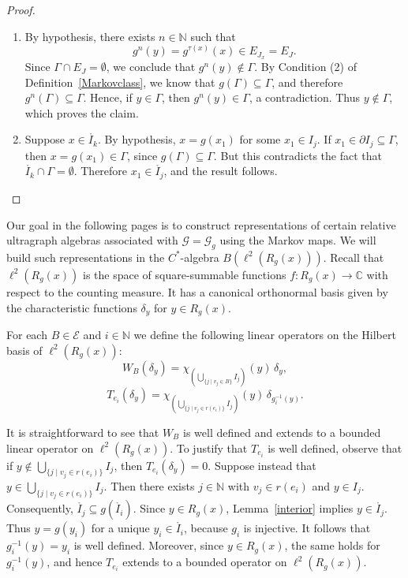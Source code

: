 \documentclass[12pt, reqno]{amsart}
\theoremstyle{definition}
\theoremstyle{remark}
\numberwithin{equation}{section}
\begin{document}
\begin{proof}
\begin{enumerate}
    \item By hypothesis, there exists $n \in \mathbb{N}$ such that 
    \[
    g^n(y) = g^{\tau(x)}(x) \in E_{J_x} = E_J.
    \]
    Since $\Gamma \cap E_J = \emptyset$, we conclude that 
    $g^n(y) \notin \Gamma$. 
    By Condition (2) of Definition~\ref{Markovclass}, we know that 
    $g(\Gamma) \subseteq \Gamma$, and therefore $g^n(\Gamma) \subseteq \Gamma$. 
    Hence, if $y \in \Gamma$, then $g^n(y) \in \Gamma$, a contradiction. 
    Thus $y \notin \Gamma$, which proves the claim.

    \item Suppose $x \in \mathring{I_k}$. 
    By hypothesis, $x = g(x_1)$ for some $x_1 \in I_j$. 
    If $x_1 \in \partial I_j \subseteq \Gamma$, then $x = g(x_1) \in \Gamma$, 
    since $g(\Gamma) \subseteq \Gamma$. 
    But this contradicts the fact that 
    $\mathring{I_k} \cap \Gamma = \emptyset$. 
    Therefore $x_1 \in \mathring{I_j}$, and the result follows.
\end{enumerate}
\end{proof}


Our goal in the following pages is to construct representations of certain 
relative ultragraph algebras associated with $\mathcal{G} = \mathcal{G}_g$ 
using the Markov maps. 
We will build such representations in the $C^*$-algebra $B(\ell^2(R_g(x)))$. 
Recall that $\ell^2(R_g(x))$ is the space of square-summable functions 
$f:R_g(x) \to \mathbb{C}$ with respect to the counting measure. 
It has a canonical orthonormal basis given by the characteristic functions 
$\delta_y$ for $y \in R_g(x)$. 

For each $B \in \mathcal{E}$ and $i \in \mathbb{N}$ we define the following 
linear operators on the Hilbert basis of $\ell^2(R_g(x))$:
\[
W_B(\delta_y) 
   = \chi_{\left( \bigcup\limits_{\{j \mid v_j \in B \}} I_j \right)}(y)\,\delta_y,
\]
\[
T_{e_i}(\delta_y) 
   = \chi_{\left( \bigcup\limits_{\{j \mid v_j \in r(e_i) \}} I_j \right)}(y)\,
      \delta_{g_i^{-1}(y)}.
\]

It is straightforward to see that $W_B$ is well defined and extends to a 
bounded linear operator on $\ell^2(R_g(x))$. 
To justify that $T_{e_i}$ is well defined, observe that if 
$y \notin \bigcup_{\{j \mid v_j \in r(e_i)\}} I_j$, 
then $T_{e_i}(\delta_y) = 0$. 
Suppose instead that 
$y \in \bigcup_{\{j \mid v_j \in r(e_i)\}} I_j$. 
Then there exists $j \in \mathbb{N}$ with $v_j \in r(e_i)$ and $y \in I_j$. 
Consequently, $\mathring{I_j} \subseteq g(\mathring{I_i})$. 
Since $y \in R_g(x)$, Lemma~\ref{interior} implies $y \in \mathring{I_j}$. 
Thus $y = g(y_i)$ for a unique $y_i \in \mathring{I_i}$, because $g_i$ is injective. 
It follows that $g_i^{-1}(y) = y_i$ is well defined. 
Moreover, since $y \in R_g(x)$, the same holds for $g_i^{-1}(y)$, and hence 
$T_{e_i}$ extends to a bounded operator on $\ell^2(R_g(x))$.
\end{document}
